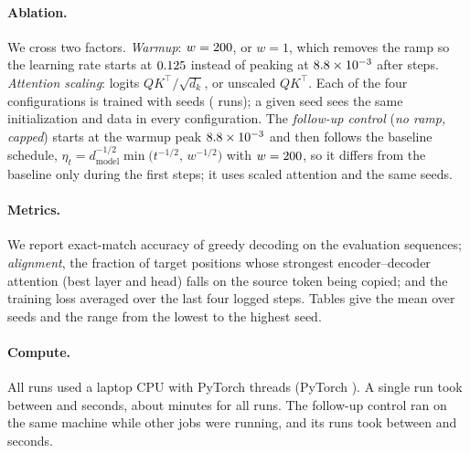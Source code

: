 \paragraph{Ablation.} We cross two factors. \emph{Warmup}: $w=200$, or $w=1$, which removes the ramp so the
learning rate starts at $0.125$ instead of peaking at $8.8\times10^{-3}$ after \valWarmup{} steps.
\emph{Attention scaling}: logits $QK^\top/\sqrt{d_k}$, or unscaled $QK^\top$. Each of the four configurations is
trained with \valSeeds{} seeds (\valRuns{} runs); a given seed sees the same initialization and data in every
configuration. The \emph{follow-up control} (\emph{no ramp, capped}) starts at the warmup peak $8.8\times10^{-3}$ and then
follows the baseline schedule, $\eta_t = d_{\mathrm{model}}^{-1/2}\min\bigl(t^{-1/2},\, w^{-1/2}\bigr)$ with $w=200$, so
it differs from the baseline only during the first \valWarmup{} steps; it uses scaled attention and the same
\valSeeds{} seeds.

\paragraph{Metrics.} We report exact-match accuracy of greedy decoding on the evaluation sequences;
\emph{alignment}, the fraction of target positions whose strongest encoder--decoder attention (best layer and head)
falls on the source token being copied; and the training loss averaged over the last four logged steps. Tables give
the mean over seeds and the range from the lowest to the highest seed.

\paragraph{Compute.} All runs used a laptop CPU with \valThreads{} PyTorch threads (PyTorch \valTorch). A single run
took between \valSecondsMin{} and \valSecondsMax{} seconds, about \valMinutesTotal{} minutes for all runs. The follow-up control ran on the same machine while other jobs were
running, and its runs took between \valRampSecondsMin{} and \valRampSecondsMax{} seconds.

